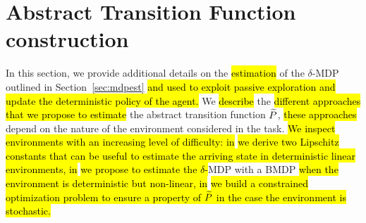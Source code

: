 \section{Abstract Transition Function construction}\label{sec:absmdp}
In this section, we provide additional details on the \hl{estimation} of the $\delta$-\ac{MDP} outlined in Section~\ref{sec:mdpest} \hl{and used to exploit passive exploration and update the deterministic policy of the agent.} We \hl{describe} the \hl{different approaches that we propose to estimate} the abstract transition function $\widetilde{P}$, \hl{these approaches} depend on the nature of the environment considered in the task. \hl{We inspect environments with an increasing level of difficulty: in}  \hl{we derive two Lipschitz constants that can be useful to estimate the arriving state in deterministic linear environments, in}  \hl{we propose to estimate the $\delta$-}\ac{MDP} with a \ac{BMDP} \hl{when the environment is deterministic but non-linear, in}  \hl{we build a constrained optimization problem to ensure a property of $\widetilde{P}$ in the case the environment is stochastic.}

